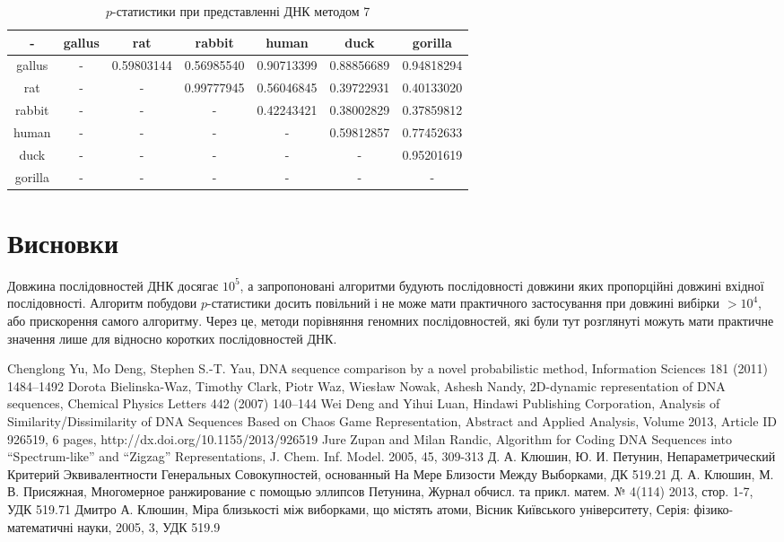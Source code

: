 \documentclass[14pt,a4paper,titlepage]{extarticle}
\begin{document}
\begin{table}[h!]
\begin{center}
\begin{tabular}{|c|c|c|c|c|c|c|}
\hline
- & gallus & rat & rabbit & human & duck & gorilla \\ \hline
gallus & - & 0.59803144 & 0.56985540 & 0.90713399 & 0.88856689 & 0.94818294 \\ \hline
rat & - & - & 0.99777945 & 0.56046845 & 0.39722931 & 0.40133020 \\ \hline
rabbit & - & - & - & 0.42243421 & 0.38002829 & 0.37859812 \\ \hline
human & - & - & - & - & 0.59812857 & 0.77452633 \\ \hline
duck & - & - & - & - & - & 0.95201619 \\ \hline
gorilla & - & - & - & - & - & - \\ \hline
\end{tabular}
\end{center}
\caption{$p$-статистики при представленні ДНК методом 7}
\label{table:res7}
\end{table}

\newpage
\section{Висновки}
Довжина послідовностей ДНК досягає $10^5$, а запропоновані алгоритми будують
послідовності довжини яких пропорційні довжині вхідної послідовності. Алгоритм
побудови $p$-статистики досить повільний і не може мати практичного
застосування при довжині вибірки $ > 10^4$, або прискорення самого алгоритму.
Через це, методи порівняння геномних послідовностей, які були тут розглянуті
можуть мати практичне значення лише для відносно коротких послідовностей ДНК.


\newpage
\begin{thebibliography}{9}

Chenglong Yu, Mo Deng, Stephen S.-T. Yau,
DNA sequence comparison by a novel probabilistic method,
Information Sciences 181 (2011) 1484–1492
Dorota Bielinska-Waz, Timothy Clark, Piotr Waz, Wiesław Nowak, Ashesh Nandy,
2D-dynamic representation of DNA sequences,
Chemical Physics Letters 442 (2007) 140–144
Wei Deng and Yihui Luan,
Hindawi Publishing Corporation,
Analysis of Similarity/Dissimilarity of DNA Sequences Based on Chaos Game Representation,
Abstract and Applied Analysis,
Volume 2013, Article ID 926519, 6 pages,
http://dx.doi.org/10.1155/2013/926519
Jure Zupan and Milan Randic,
Algorithm for Coding DNA Sequences into “Spectrum-like” and “Zigzag” Representations,
J. Chem. Inf. Model. 2005, 45, 309-313
Д. А. Клюшин, Ю. И. Петунин,
Непараметрический Критерий Эквивалентности Генеральных Совокупностей, основанный На Мере Близости Между Выборками,
ДК 519.21
Д. А. Клюшин, М. В. Присяжная,
Многомерное ранжирование с помощью эллипсов Петунина,
Журнал обчисл. та прикл. матем. № 4(114) 2013, стор. 1-7,
УДК 519.71
Дмитро А. Клюшин,
Міра близькості між виборками, що містять атоми,
Вісник Київського університету,
Серія: фізико-математичні науки,
2005, 3,
УДК 519.9

\end{thebibliography}
\end{document}
